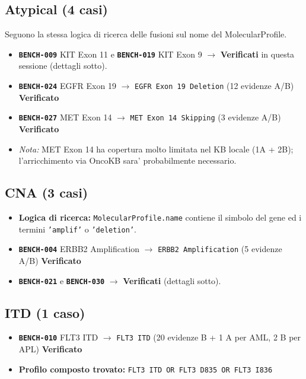 \documentclass[12pt, a4paper]{article}
\newcommand{\pass}[1]{{\color{passgreen}\textbf{#1}}}
\newcommand{\bench}[1]{{\texttt{\textbf{#1}}}}
\begin{document}
\subsection{Atypical (4 casi)}
Seguono la stessa logica di ricerca delle fusioni sul nome del MolecularProfile.
\begin{itemize}[leftmargin=1.6em, itemsep=2pt]
  \item \bench{BENCH-009} KIT Exon 11 e \bench{BENCH-019} KIT Exon 9 $\to$ \pass{Verificati} in questa sessione (dettagli sotto).
  \item \bench{BENCH-024} EGFR Exon 19 $\to$ \texttt{EGFR Exon 19 Deletion} (12 evidenze A/B) \pass{Verificato}
  \item \bench{BENCH-027} MET Exon 14 $\to$ \texttt{MET Exon 14 Skipping} (3 evidenze A/B) \pass{Verificato}
  \item \textit{Nota:} MET Exon 14 ha copertura molto limitata nel KB locale (1A + 2B); l'arricchimento via OncoKB sara' probabilmente necessario.
\end{itemize}

\subsection{CNA (3 casi)}
\begin{itemize}[leftmargin=1.6em]
  \item \textbf{Logica di ricerca:} \texttt{MolecularProfile.name} contiene il simbolo del gene ed i termini \texttt{'amplif'} o \texttt{'deletion'}.
  \item \bench{BENCH-004} ERBB2 Amplification $\to$ \texttt{ERBB2 Amplification} (5 evidenze A/B) \pass{Verificato}
  \item \bench{BENCH-021} e \bench{BENCH-030} $\to$ \pass{Verificati} (dettagli sotto).
\end{itemize}

\subsection{ITD (1 caso)}
\begin{itemize}[leftmargin=1.6em]
  \item \bench{BENCH-010} FLT3 ITD $\to$ \texttt{FLT3 ITD} (20 evidenze B + 1 A per AML, 2 B per APL) \pass{Verificato}
  \item \textbf{Profilo composto trovato:} \texttt{FLT3 ITD OR FLT3 D835 OR FLT3 I836}
\end{itemize}
\end{document}
